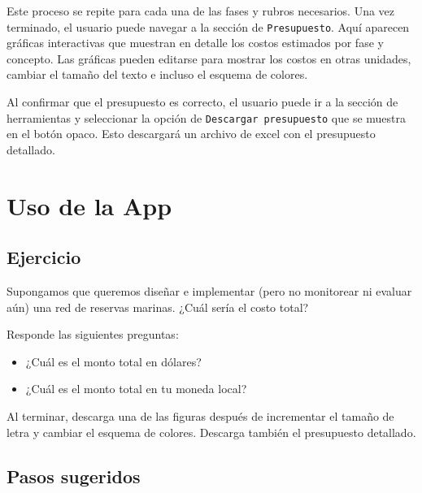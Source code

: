 \documentclass[]{krantz}
\providecommand{\tightlist}{%
  \setlength{\itemsep}{0pt}\setlength{\parskip}{0pt}}
\begin{document}
Este proceso se repite para cada una de las fases y rubros necesarios. Una vez terminado, el usuario puede navegar a la sección de \texttt{Presupuesto}. Aquí aparecen gráficas interactivas que muestran en detalle los costos estimados por fase y concepto. Las gráficas pueden editarse para mostrar los costos en otras unidades, cambiar el tamaño del texto e incluso el esquema de colores.

Al confirmar que el presupuesto es correcto, el usuario puede ir a la sección de herramientas y seleccionar la opción de \texttt{Descargar\ presupuesto} que se muestra en el botón opaco. Esto descargará un archivo de excel con el presupuesto detallado.

\hypertarget{uso-de-la-app}{%
\section{Uso de la App}\label{uso-de-la-app}}

\hypertarget{ejercicio}{%
\subsection{Ejercicio}\label{ejercicio}}

Supongamos que queremos diseñar e implementar (pero no monitorear ni evaluar aún) una red de reservas marinas. ¿Cuál sería el costo total?

Responde las siguientes preguntas:

\begin{itemize}
\tightlist
\item
  ¿Cuál es el monto total en dólares?
\item
  ¿Cuál es el monto total en tu moneda local?
\end{itemize}

Al terminar, descarga una de las figuras después de incrementar el tamaño de letra y cambiar el esquema de colores. Descarga también el presupuesto detallado.

\hypertarget{pasos-sugeridos}{%
\subsection{Pasos sugeridos}\label{pasos-sugeridos}}
\end{document}
